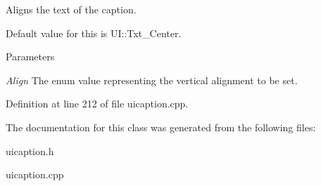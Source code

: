 Aligns the text of the caption. 

Default value for this is UI::Txt\_\-Center. 
\begin{DoxyParams}{Parameters}
\item[{\em Align}]The enum value representing the vertical alignment to be set. \end{DoxyParams}


Definition at line 212 of file uicaption.cpp.



The documentation for this class was generated from the following files:\begin{DoxyCompactItemize}
\item 
uicaption.h\item 
uicaption.cpp\end{DoxyCompactItemize}
